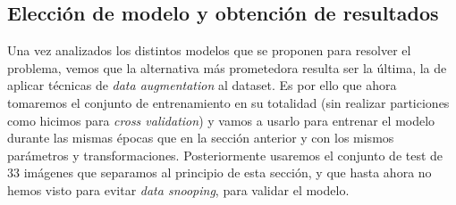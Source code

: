     \subsection{Elección de modelo y obtención de resultados}

        \noindent Una vez analizados los distintos modelos que se proponen para resolver el problema, vemos que la alternativa más prometedora resulta ser la última, la de aplicar técnicas de \textit{data augmentation} al dataset. Es por ello que ahora tomaremos el conjunto de entrenamiento en su totalidad (sin realizar particiones como hicimos para \textit{cross validation}) y vamos a usarlo para entrenar el modelo durante las mismas épocas que en la sección anterior y con los mismos parámetros y transformaciones. Posteriormente usaremos el conjunto de test de $33$ imágenes que separamos al principio de esta sección, y que hasta ahora no hemos visto para evitar \textit{data snooping}, para validar el modelo.

